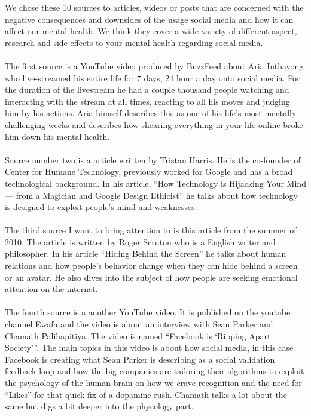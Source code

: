 \documentclass[11pt]{article}
\begin{document}
We chose these 10 sources to articles, videos or posts that are concerned with the
negative consequences and downsides of the usage social media and how it can affect
our mental health. We think they cover a wide variety of different aspect, research
and side effects to your mental health regarding social media.\\
\\
The first source \cite{youtube1} is a YouTube video produced by BuzzFeed about Aria
Inthavong who live-streamed his entire life for 7 days, 24 hour a day onto social media.
For the duration of the livestream he had a couple thousand people watching and interacting
with the stream at all times, reacting to all his moves and judging him by his actions.
Aria himself describes this as one of his life's most mentally challenging weeks and
describes how shearing everything in your life online broke him down his mental health.\\
\\
Source number two \cite{medium} is a article written by Tristan Harris. He is the
co-founder of Center for Humane Technology, previously worked for Google and has a
broad technological background. In his article, “How Technology is Hijacking Your Mind
— from a Magician and Google Design Ethicist” he talks about how technology is designed
to exploit people's mind and weaknesses.\\
\\
The third source \cite{thenewatlantis} I want to bring attention to is this article
from the summer of 2010. The article is written by Roger Scruton who is a English
writer and philosopher. In his article “Hiding Behind the Screen” he talks about
human relations and how people's behavior change when they can hide behind a screen
or an avatar. He also dives into the subject of how people are seeking emotional
attention on the internet.\\
\\
The fourth source \cite{youtube2} is a another YouTube video. It is published on
the youtube channel Ewafa and the video is about an interview with Sean Parker and
Chamath Palihapitiya. The video is named “Facebook is ‘Ripping Apart Society’”. The
main topics in this video is about how social media, in this case Facebook is creating
what Sean Parker is describing as a social validation feedback loop and how the big
companies are tailoring their algorithms to exploit the psychology of the human brain
on how we crave recognition and the need for “Likes” for that quick fix of a dopamine
rush. Chamath talks a lot about the same but digs a bit deeper into the phycology part.
\end{document}
